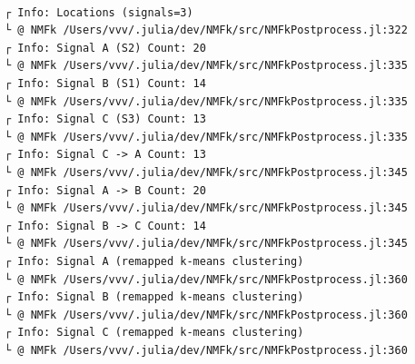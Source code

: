 \documentclass[11pt]{article}
\begin{document}
    \begin{center}
    \end{center}
    { \hspace*{\fill} \\}

    \begin{Verbatim}[commandchars=\\\{\}]
┌ Info: Locations (signals=3)
└ @ NMFk /Users/vvv/.julia/dev/NMFk/src/NMFkPostprocess.jl:322
┌ Info: Signal A (S2) Count: 20
└ @ NMFk /Users/vvv/.julia/dev/NMFk/src/NMFkPostprocess.jl:335
┌ Info: Signal B (S1) Count: 14
└ @ NMFk /Users/vvv/.julia/dev/NMFk/src/NMFkPostprocess.jl:335
┌ Info: Signal C (S3) Count: 13
└ @ NMFk /Users/vvv/.julia/dev/NMFk/src/NMFkPostprocess.jl:335
┌ Info: Signal C -> A Count: 13
└ @ NMFk /Users/vvv/.julia/dev/NMFk/src/NMFkPostprocess.jl:345
┌ Info: Signal A -> B Count: 20
└ @ NMFk /Users/vvv/.julia/dev/NMFk/src/NMFkPostprocess.jl:345
┌ Info: Signal B -> C Count: 14
└ @ NMFk /Users/vvv/.julia/dev/NMFk/src/NMFkPostprocess.jl:345
┌ Info: Signal A (remapped k-means clustering)
└ @ NMFk /Users/vvv/.julia/dev/NMFk/src/NMFkPostprocess.jl:360
┌ Info: Signal B (remapped k-means clustering)
└ @ NMFk /Users/vvv/.julia/dev/NMFk/src/NMFkPostprocess.jl:360
┌ Info: Signal C (remapped k-means clustering)
└ @ NMFk /Users/vvv/.julia/dev/NMFk/src/NMFkPostprocess.jl:360
    \end{Verbatim}

    \begin{center}
    \end{center}
    { \hspace*{\fill} \\}

    \begin{Verbatim}[commandchars=\\\{\}]

    \end{Verbatim}

    \begin{center}
    \end{center}
    { \hspace*{\fill} \\}

    \begin{center}
    \end{center}
    { \hspace*{\fill} \\}
\end{document}
